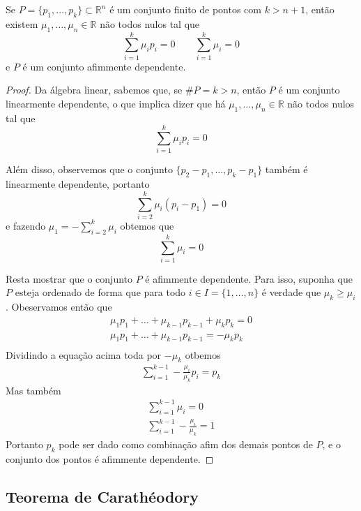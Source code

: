 \begin{lemma:afim}
	\label{lemma:afim}
	Se $P = \{p_1, \ldots, p_k\} \subset \mathbb{R}^n$ é um conjunto
	finito de pontos com $k > n + 1$, então existem $\mu_1, \ldots, \mu_n
	\in \mathbb{R}$ não todos nulos tal que
	\begin{equation*}
		\displaystyle\sum_{i=1}^k \mu_i p_i = 0 \quad\quad \displaystyle\sum_{i=1}^k \mu_i = 0
	\end{equation*}
	e $P$ é um conjunto afimmente dependente.

	\begin{proof}
		Da álgebra linear, sabemos que, se $\#P = k > n$, então $P$ é um conjunto
		linearmente dependente, o que implica dizer que há $\mu_1, \ldots, \mu_n
		\in \mathbb{R}$ não todos nulos tal que
		\[\displaystyle\sum_{i=1}^k \mu_i p_i = 0\]

		Além disso, observemos que o conjunto $\{p_2 - p_1, \ldots, p_k - p_1\}$
		também é linearmente dependente, portanto
		\[\displaystyle\sum_{i=2}^k \mu_i (p_i - p_1) = 0\]
		e fazendo \(\mu_1 = -\displaystyle\sum_{i=2}^k \mu_i\)
		obtemos que
		\[\displaystyle\sum_{i=1}^k \mu_i = 0\]

		Resta mostrar que o conjunto $P$ é afimmente dependente. Para isso, suponha
		que $P$ esteja ordenado de forma que para todo $i \in I = \{1, \ldots, n\}$
		é verdade que $\mu_k \geq \mu_i$. Obeservamos então que
	  \begin{gather*}
	    \mu_1 p_1 + \ldots + \mu_{k - 1} p_{k-1} + \mu_k p_k = 0 \\
      \mu_1 p_1 + \ldots + \mu_{k - 1} p_{k-1} = - \mu_k p_k \\
	  \end{gather*}
	  Dividindo a equação acima toda por $-\mu_k$ otbemos
	  \begin{gather*}
	    \sum_{i=1}^{k-1} -\frac{\mu_i}{\mu_k} p_i = p_k
	  \end{gather*}
	  Mas também
	  \begin{gather*}
      \sum_{i=1}^{k-1} \mu_i = 0 \\
	    \sum_{i=1}^{k-1} -\frac{\mu_i}{\mu_k} = 1
	  \end{gather*}
	  Portanto $p_k$ pode ser dado como combinação afim dos demais pontos de
	  $P$, e o conjunto dos pontos é afimmente dependente.
	\end{proof}
\end{lemma:afim}

\subsection{Teorema de Carathéodory}

